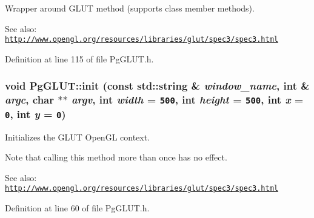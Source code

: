 Wrapper around GLUT method (supports class member methods). 

\begin{Desc}
\item[See also:]\href{http://www.opengl.org/resources/libraries/glut/spec3/spec3.html}{\tt http://www.opengl.org/resources/libraries/glut/spec3/spec3.html} \end{Desc}


Definition at line 115 of file PgGLUT.h.\hypertarget{namespace_pg_g_l_u_t_95723231de4f81fc9e6596a7f60f0811}{
\subsubsection[init]{\setlength{\rightskip}{0pt plus 5cm}void PgGLUT::init (const std::string \& {\em window\_\-name}, \/  int \& {\em argc}, \/  char $\ast$$\ast$ {\em argv}, \/  int {\em width} = {\tt 500}, \/  int {\em height} = {\tt 500}, \/  int {\em x} = {\tt 0}, \/  int {\em y} = {\tt 0})}}
\label{namespace_pg_g_l_u_t_95723231de4f81fc9e6596a7f60f0811}


Initializes the GLUT OpenGL context. 

Note that calling this method more than once has no effect. \begin{Desc}
\item[See also:]\href{http://www.opengl.org/resources/libraries/glut/spec3/spec3.html}{\tt http://www.opengl.org/resources/libraries/glut/spec3/spec3.html} \end{Desc}


Definition at line 60 of file PgGLUT.h.